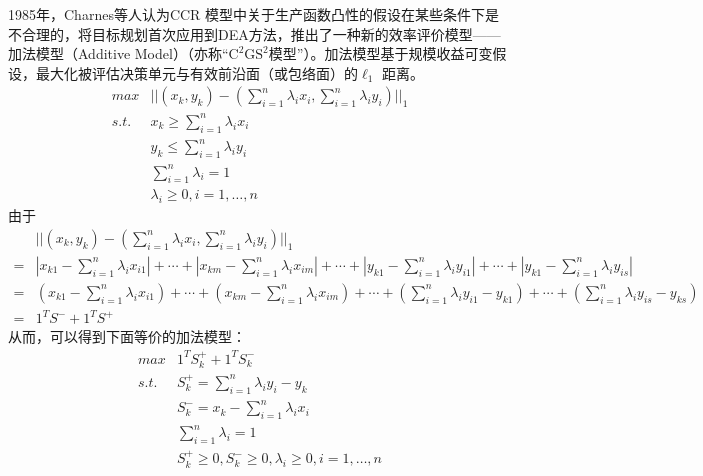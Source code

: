1985年，Charnes等人\cite{charnes1985foundations}认为CCR 模型中关于生产函数凸性的假设在某些条件下是不合理的，将目标规划首次应用到DEA方法，推出了一种新的效率评价模型——加法模型（Additive Model）（亦称“$\mathrm{C^2GS^2}$模型”）。加法模型基于规模收益可变假设，最大化被评估决策单元与有效前沿面（或包络面）的$\ell_1$ 距离。
\begin{equation}\label{eq:c2gs2-l1}
  \begin{array}{ll}
    \textit{max} & ||(x_k, y_k) - (\sum\limits_{i=1}^n \lambda_i x_i,\sum\limits_{i=1}^n \lambda_i y_i)||_1\\
    \textit{s.t.} & x_k \ge \sum\limits_{i=1}^n \lambda_i x_i \\
    & y_k \le \sum\limits_{i=1}^n \lambda_i y_i\\
    & \sum\limits_{i=1}^n \lambda_i = 1\\
    & \lambda_i \ge 0, i =1,\ldots, n
  \end{array}
\end{equation}
由于
\begin{equation}
  \begin{array}{lll}
    & ||(x_k, y_k) - (\sum\limits_{i=1}^n \lambda_i x_i,\sum\limits_{i=1}^n \lambda_i y_i)||_1 \\
    = &  |x_{k1} - \sum\limits_{i=1}^n \lambda_i x_{i1}| + \cdots + |x_{km} - \sum\limits_{i=1}^n \lambda_i x_{im}| + \cdots + |y_{k1} - \sum\limits_{i=1}^n \lambda_i y_{i1}| + \cdots + |y_{k1} - \sum\limits_{i=1}^n \lambda_i y_{is}|\\
    = & (x_{k1} - \sum\limits_{i=1}^n \lambda_i x_{i1}) + \cdots  + (x_{km} - \sum\limits_{i=1}^n \lambda_i x_{im}) + \cdots + (\sum\limits_{i=1}^n \lambda_i y_{i1} - y_{k1}) + \cdots + (\sum\limits_{i=1}^n \lambda_i y_{is} - y_{ks})\\
    = & 1^T S^{-} + 1^T S^{+}
  \end{array}
\end{equation}
从而，可以得到下面等价的加法模型：
\begin{equation}\label{eq:c2gs2}
  \begin{array}{ll}
    \textit{max} & 1^T S^{+}_k + 1^T S^{-}_k\\
    \textit{s.t.} & S^{+}_k = \sum\limits_{i=1}^n \lambda_i y_i - y_k \\
    & S^{-}_k = x_k - \sum\limits_{i=1}^n \lambda_i x_i\\
    & \sum\limits_{i=1}^n \lambda_i = 1\\
    & S^{+}_k \ge 0, S^{-}_k  \ge 0,\lambda_i \ge 0, i =1,\ldots, n
  \end{array}
\end{equation}


